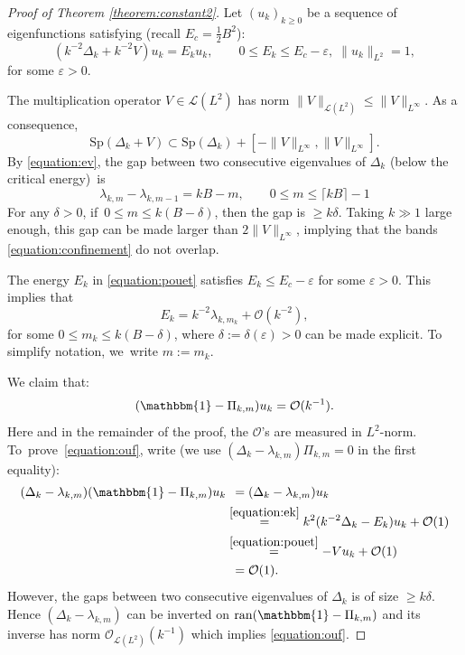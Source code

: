 \documentclass[JEP,XML,SOM,Unicode,published]{cedram}
\theoremstyle{plain}
\theoremstyle{definition}
\let\mc\mathcal
\let\eps\varepsilon
\DeclareMathOperator{\ran}{ran}
\newcommand{\bigo}{\mathcal{O}}
\begin{document}
\begin{proof}[Proof of Theorem \ref{theorem:constant2}]
Let $(u_k)_{k \geq 0}$ be a sequence of eigenfunctions satisfying (recall $E_c=\tfrac{1}{2}B^2$):
\begin{equation}
\label{equation:pouet}
(k^{-2}\Delta_k + k^{-2}V) u_k = E_k u_k, \qquad 0 \leq E_k \leq E_c -\eps,
\; \|u_k\|_{L^2}=1,
\end{equation}
for some $\eps > 0$.

The multiplication operator $V \in \mc{L}(L^2)$ has norm $\|V\|_{\mc{L}(L^2) } \leq \|V\|_{L^\infty}$. As a consequence,
\begin{equation}
\label{equation:confinement}
\mathrm{Sp}(\Delta_k + V) \subset \mathrm{Sp}(\Delta_k) + [-\|V\|_{L^\infty},\|V\|_{L^\infty}].
\end{equation}
By \eqref{equation:ev}, the gap between two consecutive eigenvalues of $\Delta_k$ (below the critical energy)~is
\[
\lambda_{k,m}-\lambda_{k,m-1} = kB-m, \qquad 0 \leq m \leq \lceil kB\rceil - 1
\]
For any $\delta > 0$, if~$0 \leq m \leq k(B-\delta)$, then the gap is $\geq
k\delta $. Taking $k \gg 1$ large enough, this gap can be made larger than $2\|V\|_{L^\infty}$, implying that the bands \eqref{equation:confinement} do not overlap.

The energy $E_k$ in \eqref{equation:pouet} satisfies $E_k \leq E_c-\eps$ for some $\eps > 0$. This implies that
\begin{equation}
\label{equation:ek}
E_k = k^{-2}\lambda_{k,m_k} + \mc{O}(k^{-2}),
\end{equation}
for some $0 \leq m_k \leq k(B -\delta)$, where $\delta := \delta(\eps) > 0$ can be made explicit. To simplify notation, we~write $m:=m_k$.

We claim that:\vspace*{-3pt}
\begin{equation}
\label{equation:ouf}
(\mathbbm{1}-\Pi_{k,m}) u_k = \mc{O}(k^{-1}).
\end{equation}
Here and in the remainder of the proof, the $\bigo$'s are measured in
$L^2$-norm. To~prove~\eqref{equation:ouf}, write (we use $(\Delta_{k} -\lambda_{k,m})\Pi_{k,m} =0$ in the first equality):
\[
\begin{split}
(\Delta_{k} -\lambda_{k,m})(\mathbbm{1}-\Pi_{k,m})u_k &\;\,= (\Delta_{k}
-\lambda_{k,m})u_k \\
& \overset{\eqref{equation:ek}}{=} k^{2}(k^{-2}\Delta_k- E_k) u_k + \mc{O}(1) \\
& \overset{\eqref{equation:pouet}}{=} - V u_k + \mc{O}(1) \\
&\;\,= \mc{O}(1).
\end{split}
\]
However, the gaps between two consecutive eigenvalues of $\Delta_k$ is of size
$\geq k\delta $. Hence $(\Delta_{k} -\lambda_{k,m})$ can be inverted on
$\ran(\mathbbm{1}-\Pi_{k,m})$ and its inverse has norm $\mc{O}_{\mc{L}(L^2)}(k^{-1})$ which implies \eqref{equation:ouf}.


\end{proof}
\end{document}
